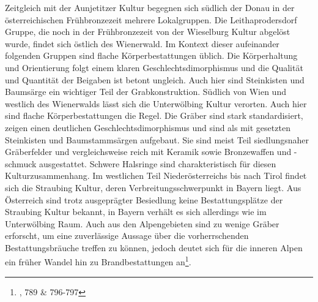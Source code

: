 \documentclass[openany,twoside,twocolumn]{book}
\let\rmarkdownfootnote\footnote%
\def\footnote{\protect\rmarkdownfootnote}
\begin{document}
Zeitgleich mit der Aunjetitzer Kultur begegnen sich südlich der Donau in
der österreichischen Frühbronzezeit mehrere Lokalgruppen. Die
Leithaprodersdorf Gruppe, die noch in der Frühbronzezeit von der
Wieselburg Kultur abgelöst wurde, findet sich östlich des Wienerwald. Im
Kontext dieser aufeinander folgenden Gruppen sind flache
Körperbestattungen üblich. Die Körperhaltung und Orientierung folgt
einem klaren Geschlechtsdimorphismus und die Qualität und Quantität der
Beigaben ist betont ungleich. Auch hier sind Steinkisten und Baumsärge
ein wichtiger Teil der Grabkonstruktion. Südlich von Wien und westlich
des Wienerwalds lässt sich die Unterwölbing Kultur verorten. Auch hier
sind flache Körperbestattungen die Regel. Die Gräber sind stark
standardisiert, zeigen einen deutlichen Geschlechtsdimorphismus und sind
als mit gesetzten Steinkisten und Baumstammsärgen aufgebaut. Sie sind
meist Teil siedlungsnaher Gräberfelder und vergleichsweise reich mit
Keramik sowie Bronzewaffen und -schmuck ausgestattet. Schwere Halsringe
sind charakteristisch für diesen Kulturzusammenhang. Im westlichen Teil
Niederösterreichs bis nach Tirol findet sich die Straubing Kultur, deren
Verbreitungsschwerpunkt in Bayern liegt. Aus Österreich sind trotz
ausgeprägter Besiedlung keine Bestattungsplätze der Straubing Kultur
bekannt, in Bayern verhält es sich allerdings wie im Unterwölbing Raum.
Auch aus den Alpengebieten sind zu wenige Gräber erforscht, um eine
zuverlässige Aussage über die vorherrschenden Bestattungsbräuche treffen
zu können, jedoch deutet sich für die inneren Alpen ein früher Wandel
hin zu Brandbestattungen an\footnote{\textcite{lubos_czech_2013}, 789 \&
  796-797}.
\end{document}

